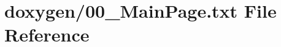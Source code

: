 \hypertarget{00__MainPage_8txt}{\section{doxygen/00\+\_\+\+Main\+Page.txt File Reference}
\label{00__MainPage_8txt}
}
